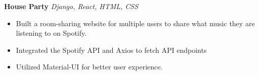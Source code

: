 \documentclass[a4paper]{article}
\begin{document}
{\textbf{House Party}} {\sl Django, React, HTML, CSS} \\
\vspace{-1mm}
\begin{itemize} \itemsep 1pt
	\item Built a room-sharing website for multiple users to share what music they are listening to on Spotify.
	\item Integrated the Spotify API and Axios to fetch API endpoints
        \item Utilized Material-UI for better user experience.\\
\end{itemize}
\vspace*{1mm}
\end{document}
